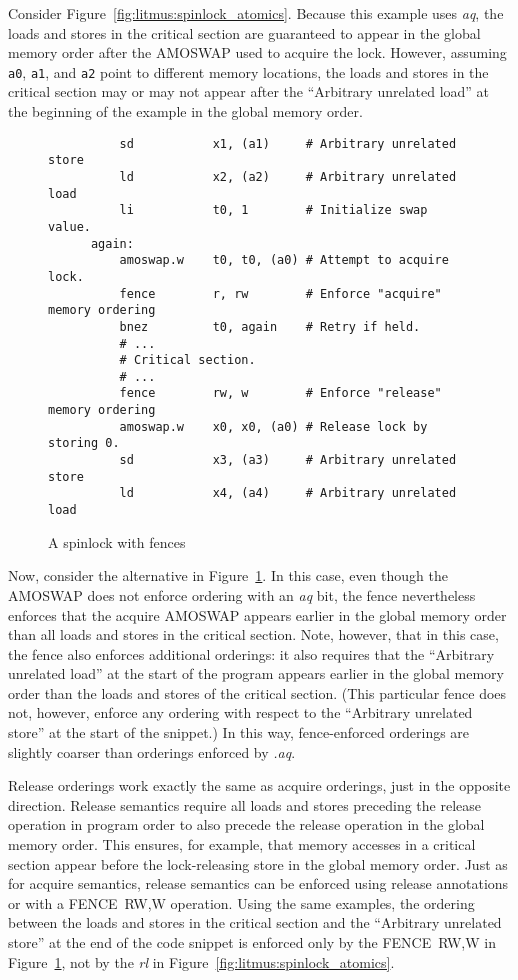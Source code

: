 Consider Figure~\ref{fig:litmus:spinlock_atomics}.
Because this example uses {\em aq}, the loads and stores in the critical section are guaranteed to appear in the global memory order after the AMOSWAP used to acquire the lock.  However, assuming {\tt a0}, {\tt a1}, and {\tt a2} point to different memory locations, the loads and stores in the critical section may or may not appear after the ``Arbitrary unrelated load'' at the beginning of the example in the global memory order.

\begin{figure}[h!]
  \centering\small
  \begin{verbatim}
          sd           x1, (a1)     # Arbitrary unrelated store
          ld           x2, (a2)     # Arbitrary unrelated load
          li           t0, 1        # Initialize swap value.
      again:
          amoswap.w    t0, t0, (a0) # Attempt to acquire lock.
          fence        r, rw        # Enforce "acquire" memory ordering
          bnez         t0, again    # Retry if held.
          # ...
          # Critical section.
          # ...
          fence        rw, w        # Enforce "release" memory ordering
          amoswap.w    x0, x0, (a0) # Release lock by storing 0.
          sd           x3, (a3)     # Arbitrary unrelated store
          ld           x4, (a4)     # Arbitrary unrelated load
  \end{verbatim}
  \caption{A spinlock with fences}
  \label{fig:litmus:spinlock_fences}
\end{figure}

Now, consider the alternative in Figure~\ref{fig:litmus:spinlock_fences}.
In this case, even though the AMOSWAP does not enforce ordering with an {\em aq} bit, the fence nevertheless enforces that the acquire AMOSWAP appears earlier in the global memory order than all loads and stores in the critical section.
Note, however, that in this case, the fence also enforces additional orderings: it also requires that the ``Arbitrary unrelated load'' at the start of the program appears earlier in the global memory order than the loads and stores of the critical section.  (This particular fence does not, however, enforce any ordering with respect to the ``Arbitrary unrelated store'' at the start of the snippet.)
In this way, fence-enforced orderings are slightly coarser than orderings enforced by {\em .aq}.

Release orderings work exactly the same as acquire orderings, just in the opposite direction.  Release semantics require all loads and stores preceding the release operation in program order to also precede the release operation in the global memory order.
This ensures, for example, that memory accesses in a critical section appear before the lock-releasing store in the global memory order.  Just as for acquire semantics, release semantics can be enforced using release annotations or with a FENCE~RW,W operation.  Using the same examples, the ordering between the loads and stores in the critical section and the ``Arbitrary unrelated store'' at the end of the code snippet is enforced only by the FENCE~RW,W in Figure~\ref{fig:litmus:spinlock_fences}, not by the {\em rl} in Figure~\ref{fig:litmus:spinlock_atomics}.

